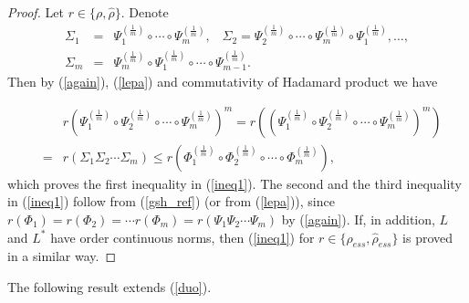 \documentclass[12pt, reqno]{amsart}
\theoremstyle{definition}
\theoremstyle{remark}
\numberwithin{equation}{section}
\begin{document}
\begin{proof}
Let $r\in\{  \rho, \hat{\rho}\}$. Denote
\begin{eqnarray}
\nonumber
\Sigma _1 &= & \Psi _1 ^{\left( \frac{1}{m} \right)}  \circ\cdots\circ \Psi _m  ^{\left( \frac{1}{m} \right)} , \;\;\; \Sigma _2= \Psi _2 ^{\left( \frac{1}{m} \right)}  \circ\cdots\circ \Psi _m  ^{\left( \frac{1}{m}\right)} \circ \Psi _1 ^{\left( \frac{1}{m} \right)}, \ldots, \\
\nonumber
\Sigma _m &=&\Psi _m ^{\left( \frac{1}{m} \right)} \circ \Psi _1 ^{\left( \frac{1}{m} \right)} \circ\cdots\circ \Psi _{m-1}  ^{\left( \frac{1}{m} \right)}.
\end{eqnarray}
Then by  (\ref{again}), (\ref{lepa}) and commutativity of Hadamard product we have

\begin{eqnarray}
\nonumber
& & r \left(\Psi _1 ^{\left( \frac{1}{m} \right)} \circ\Psi _2^{\left( \frac{1}{m} \right)}\circ\cdots\circ \Psi _m  ^{\left( \frac{1}{m} \right)} \right)^m = 
 r \left(\left(\Psi _1 ^{\left( \frac{1}{m} \right)} \circ\Psi _2^{\left( \frac{1}{m} \right)}\circ\cdots\circ \Psi _m  ^{\left( \frac{1}{m} \right)} \right)^m\right)  \\
 \nonumber
 &=& r (\Sigma _1 \Sigma_2 \cdots \Sigma _m)\le r \left(\Phi _1^{\left( \frac{1}{m} \right)} \circ\Phi_2^{\left( \frac{1}{m} \right)}\circ\cdots\circ \Phi _m ^{\left( \frac{1}{m} \right)} \right),
\end{eqnarray}
which proves the first inequality in (\ref{ineq1}).
 The second and the third inequality in (\ref{ineq1}) follow from (\ref{gsh_ref}) (or from (\ref{lepa})), since $r(\Phi_1)=r(\Phi_2)=\cdots r(\Phi_m)=r(\Psi_1\Psi_2\cdots\Psi_m)$ by (\ref{again}). If, in addition, $L$ and $L^*$ have order continuous norms, then (\ref{ineq1}) for $r\in \{ \rho _{ess}, \hat{\rho} _{ess}\}$ is proved in a similar way.
 \end{proof}


The following result extends (\ref{duo}).
\end{document}

